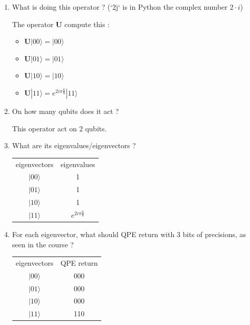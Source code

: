 \documentclass{article}
\theoremstyle{plain}
\begin{document}
    \begin{enumerate}
      \item What is doing this operator ?
        (`2j` is in Python the complex number $2\cdot i$)

      The operator $\mathbf{U}$ compute this :
      \begin{itemize}
        \item $\mathbf{U} |00\rangle = |00\rangle$
        \item $\mathbf{U} |01\rangle = |01\rangle$
        \item $\mathbf{U} |10\rangle = |10\rangle$
        \item $\mathbf{U} |11\rangle = e^{2i \pi \frac 6 8}|11\rangle$
      \end{itemize}

      \item On how many qubits does it act ?

        This operator act on 2 qubits.

      \item What are its eigenvalues/eigenvectors ?

        \begin{center}
        \begin{tabular}{c c}
          eigenvectors & eigenvalues \\
          $|00\rangle$ & 1 \\
          $|01\rangle$ & 1 \\
          $|10\rangle$ & 1 \\
          $|11\rangle$ & $e^{2i \pi \frac 6 8}$
        \end{tabular}
        \end{center}

      \item For each eigenvector, what should QPE return with 3 bits of
        precisions, as seen in the course ?

        \begin{center}
        \begin{tabular}{c c}
          eigenvectors & QPE return \\
          $|00\rangle$ & 000 \\
          $|01\rangle$ & 000 \\
          $|10\rangle$ & 000 \\
          $|11\rangle$ & 110
        \end{tabular}
        \end{center}
    \end{enumerate}
\end{document}
